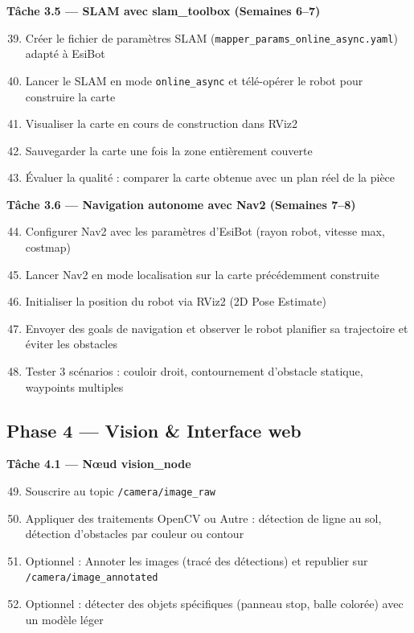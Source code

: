 \documentclass[12pt,a4paper]{article}
\begin{document}
\textbf{Tâche 3.5 — SLAM avec slam\_toolbox (Semaines 6–7)}

\begin{enumerate}
  \setcounter{enumi}{38}
  \item Créer le fichier de paramètres SLAM (\texttt{mapper\_params\_online\_async.yaml}) adapté à EsiBot
  \item Lancer le SLAM en mode \texttt{online\_async} et télé-opérer le robot pour construire la carte
  \item Visualiser la carte en cours de construction dans RViz2
  \item Sauvegarder la carte une fois la zone entièrement couverte
  \item Évaluer la qualité : comparer la carte obtenue avec un plan réel de la pièce
\end{enumerate}

\textbf{Tâche 3.6 — Navigation autonome avec Nav2 (Semaines 7–8)}

\begin{enumerate}
  \setcounter{enumi}{43}
  \item Configurer Nav2 avec les paramètres d'EsiBot (rayon robot, vitesse max, costmap)
  \item Lancer Nav2 en mode localisation sur la carte précédemment construite
  \item Initialiser la position du robot via RViz2 (2D Pose Estimate)
  \item Envoyer des goals de navigation et observer le robot planifier sa trajectoire et éviter les obstacles
  \item Tester 3 scénarios : couloir droit, contournement d'obstacle statique, waypoints multiples
\end{enumerate}

\subsection*{Phase 4 — Vision \& Interface web}

\textbf{Tâche 4.1 — Nœud vision\_node}

\begin{enumerate}
  \setcounter{enumi}{48}
  \item Souscrire au topic \texttt{/camera/image\_raw}
  \item Appliquer des traitements OpenCV ou Autre : détection de ligne au sol, détection d'obstacles par couleur ou contour
  \item Optionnel : Annoter les images (tracé des détections) et republier sur \texttt{/camera/image\_annotated}
  \item Optionnel : détecter des objets spécifiques (panneau stop, balle colorée) avec un modèle léger
\end{enumerate}
\end{document}
